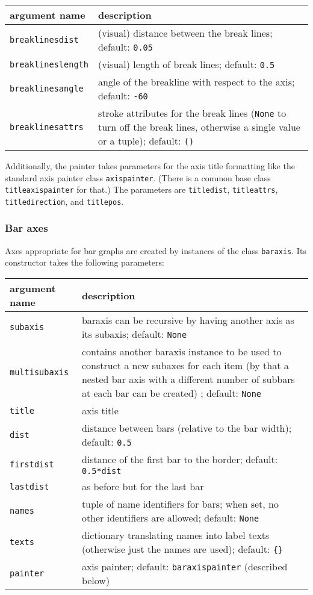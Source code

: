 \medskip
\begin{tabularx}{\linewidth}{l>{\raggedright\arraybackslash}X}
argument name&description\\
\hline
\texttt{breaklinesdist}&(visual) distance between the break lines; default: \texttt{0.05}\\
\texttt{breaklineslength}&(visual) length of break lines; default: \texttt{0.5}\\
\texttt{breaklinesangle}&angle of the breakline with respect to the axis; default: \texttt{-60}\\
\texttt{breaklinesattrs}&stroke attributes for the break lines (\texttt{None} to turn off the break lines, otherwise a single value or a tuple); default: \texttt{()}\\
\end{tabularx}

Additionally, the painter takes parameters for the axis title
formatting like the standard axis painter class \verb|axispainter|.
(There is a common base class \verb|titleaxispainter| for that.) The
parameters are \verb|titledist|, \verb|titleattrs|,
\verb|titledirection|, and \verb|titlepos|.

\subsubsection{Bar axes}

Axes appropriate for bar graphs are created by instances of the class
\verb|baraxis|. Its constructor takes the following parameters:

\medskip
\begin{tabularx}{\linewidth}{l>{\raggedright\arraybackslash}X}
argument name&description\\
\hline
\texttt{subaxis}&baraxis can be recursive by having another axis as its subaxis; default: \texttt{None}\\
\texttt{multisubaxis}&contains another baraxis instance to be used to construct a new subaxes for each item (by that a nested bar axis with a different number of subbars at each bar can be created) ; default: \texttt{None}\\
\texttt{title}&axis title\\
\texttt{dist}&distance between bars (relative to the bar width); default: \texttt{0.5}\\
\texttt{firstdist}&distance of the first bar to the border; default: \texttt{0.5*dist}\\
\texttt{lastdist}&as before but for the last bar\\
\texttt{names}&tuple of name identifiers for bars; when set, no other identifiers are allowed; default: \texttt{None}\\
\texttt{texts}&dictionary translating names into label texts (otherwise just the names are used); default: \texttt{\{\}}\\
\texttt{painter}&axis painter; default: \texttt{baraxispainter} (described below)\\
\end{tabularx}
\medskip

